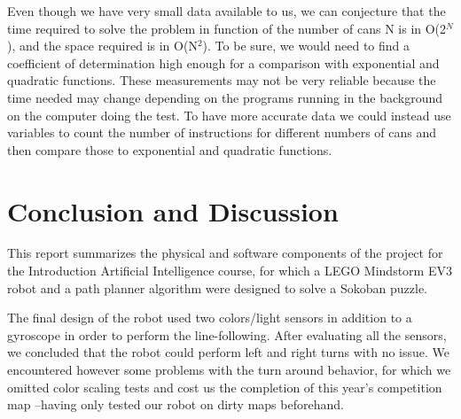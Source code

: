 \documentclass[a4paper,12pt]{article}
\begin{document}
\begin{center}
\end{center}

Even though we have very small data available to us, we can conjecture that the time required to solve the problem in function of the number of cans N is in O(2$^{N}$), and the space required is in O(N$^{2}$). To be sure, we would need to find a coefficient of determination high enough for a comparison with exponential and quadratic functions. These measurements may not be very reliable because the time needed may change depending on the programs running in the background on the computer doing the test. To have more accurate data we could instead use variables to count the number of instructions for different numbers of cans and then compare those to exponential and quadratic functions.


\newpage
\section{Conclusion and Discussion\newline}
This report summarizes the physical and software components of the project for  the Introduction Artificial Intelligence course, for which a LEGO Mindstorm EV3 robot and a path planner algorithm were designed to solve a Sokoban puzzle.

The final design of the robot used two colors/light sensors in addition to a gyroscope in order to perform the line-following. After evaluating all the sensors, we concluded that the robot could perform left and right turns with no issue. We encountered however some problems with the turn around behavior, for which we omitted color scaling tests and cost us the completion of this year's competition map --having only tested our robot on dirty maps beforehand.
\end{document}
